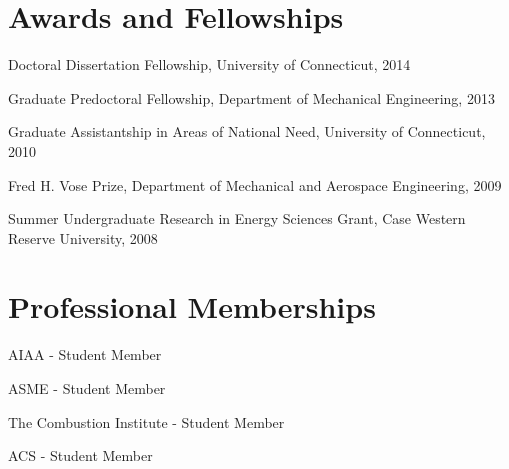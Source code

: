 \section{{\sectionfont Awards and Fellowships}}

Doctoral Dissertation Fellowship, University of Connecticut, 2014

Graduate Predoctoral Fellowship, Department of Mechanical
Engineering, 2013

Graduate Assistantship in Areas of National
Need, University of Connecticut, 2010

Fred H. Vose Prize, Department of Mechanical and
Aerospace Engineering, 2009

Summer Undergraduate Research in Energy Sciences
Grant, Case Western Reserve University, 2008

\section{{\sectionfont Professional Memberships}}
AIAA - Student Member

ASME - Student Member

The Combustion Institute - Student Member

ACS - Student Member



